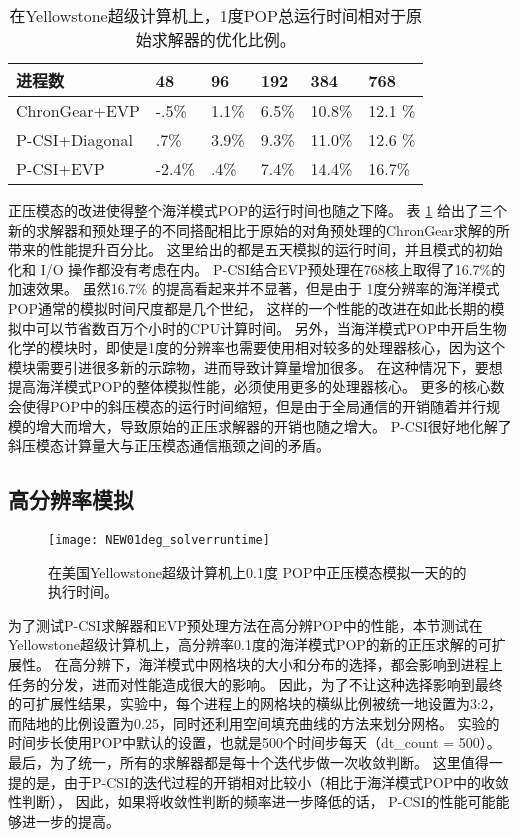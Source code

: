 \begin{table}[!ht]
\begin{center}
\caption{在Yellowstone超级计算机上，1度POP总运行时间相对于原始求解器的优化比例。 \label{tab:improve_1}}
\begin{tabular}{|l||l|l|l|l|l|}
\hline
进程数 & 48  & 96  & 192 & 384 & 768\\\hline
\hline
ChronGear+EVP & -.5\% & 1.1\%  & 6.5\% & 10.8\%  & 12.1 \% \\\hline
P-CSI+Diagonal  & .7\% &3.9\% &9.3\%  &11.0\% & 12.6 \% \\\hline
P-CSI+EVP	      &-2.4\% & .4\%	& 7.4\%  & 14.4\% & 16.7\%\\\hline
\end{tabular}
\end{center}
\end{table}
正压模态的改进使得整个海洋模式POP的运行时间也随之下降。
表 \ref{tab:improve_1} 给出了三个新的求解器和预处理子的不同搭配相比于原始的对角预处理的ChronGear求解的所带来的性能提升百分比。 
这里给出的都是五天模拟的运行时间，并且模式的初始化和 I/O 操作都没有考虑在内。 
P-CSI结合EVP预处理在768核上取得了16.7\%的加速效果。
虽然16.7\% 的提高看起来并不显著，但是由于 1度分辨率的海洋模式POP通常的模拟时间尺度都是几个世纪， 这样的一个性能的改进在如此长期的模拟中可以节省数百万个小时的CPU计算时间。 
另外，当海洋模式POP中开启生物化学的模块时，即使是1度的分辨率也需要使用相对较多的处理器核心，因为这个模块需要引进很多新的示踪物，进而导致计算量增加很多。 
在这种情况下，要想提高海洋模式POP的整体模拟性能，必须使用更多的处理器核心。
更多的核心数会使得POP中的斜压模态的运行时间缩短，但是由于全局通信的开销随着并行规模的增大而增大，导致原始的正压求解器的开销也随之增大。 
P-CSI很好地化解了斜压模态计算量大与正压模态通信瓶颈之间的矛盾。

\subsection{高分辨率模拟}
\label{precond:exp:high}

\begin {figure}[!t]
\centering
\texttt{[image: NEW01deg\_solverruntime]}
\caption []{ 在美国Yellowstone超级计算机上0.1度 POP中正压模态模拟一天的的执行时间。\label {fig:runtime01_time}}
\end {figure}
为了测试P-CSI求解器和EVP预处理方法在高分辨POP中的性能，本节测试在Yellowstone超级计算机上，高分辨率0.1度的海洋模式POP的新的正压求解的可扩展性。 
在高分辨下，海洋模式中网格块的大小和分布的选择，都会影响到进程上任务的分发，进而对性能造成很大的影响。 
因此，为了不让这种选择影响到最终的可扩展性结果，实验中，每个进程上的网格块的横纵比例被统一地设置为3:2，而陆地的比例设置为0.25，同时还利用空间填充曲线的方法来划分网格。 
实验的时间步长使用POP中默认的设置，也就是500个时间步每天（dt\_count = 500）。 
最后，为了统一，所有的求解器都是每十个迭代步做一次收敛判断。 
这里值得一提的是，由于P-CSI的迭代过程的开销相对比较小（相比于海洋模式POP中的收敛性判断）， 因此，如果将收敛性判断的频率进一步降低的话， P-CSI的性能可能能够进一步的提高。 
 
